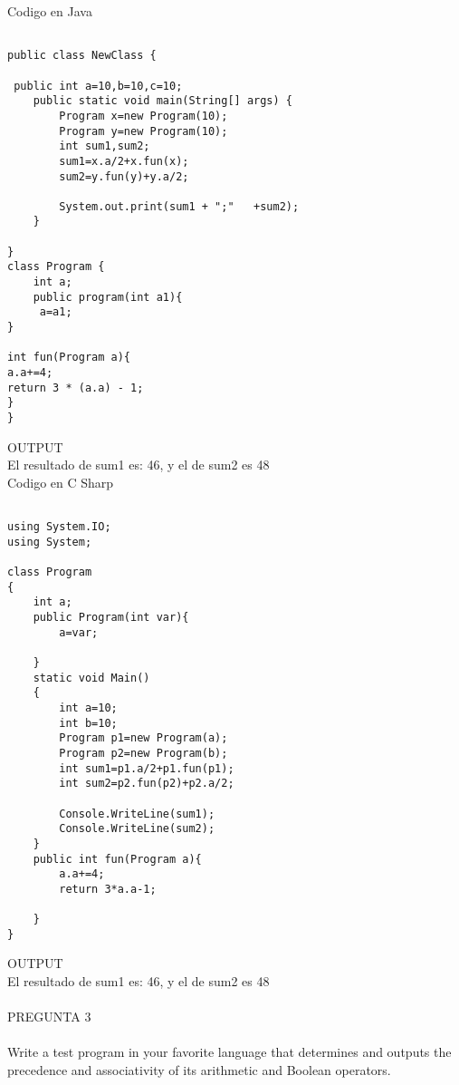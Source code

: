 \documentclass[../main.tex]{subfiles}
\begin{document}
Codigo en Java\\
\begin{lstlisting}[frame=single]  

public class NewClass {
    
 public int a=10,b=10,c=10;
    public static void main(String[] args) {
        Program x=new Program(10);
        Program y=new Program(10);
        int sum1,sum2;
        sum1=x.a/2+x.fun(x);
        sum2=y.fun(y)+y.a/2;

        System.out.print(sum1 + ";"   +sum2);
    }

}
class Program {
	int a;
	public program(int a1){
   	 a=a1;
}    

int fun(Program a){
a.a+=4;
return 3 * (a.a) - 1;
}
}

\end{lstlisting}
OUTPUT\\
El resultado de sum1 es: 46, y el de sum2 es 48\\




Codigo en C Sharp
\begin{lstlisting}[frame=single]

using System.IO;
using System;

class Program
{
    int a;
    public Program(int var){
        a=var;
        
    }
    static void Main()
    {
        int a=10;
        int b=10;
        Program p1=new Program(a);
        Program p2=new Program(b);
        int sum1=p1.a/2+p1.fun(p1);
        int sum2=p2.fun(p2)+p2.a/2;
        
        Console.WriteLine(sum1);
        Console.WriteLine(sum2);
    }
    public int fun(Program a){
        a.a+=4;
        return 3*a.a-1;
        
    }
}

\end{lstlisting}
OUTPUT\\
El resultado de sum1 es: 46, y el de sum2 es 48\\



\paragraph{ }PREGUNTA 3
\paragraph{ }
Write a test program in your favorite language that determines and outputs the precedence and associativity of its arithmetic and Boolean operators.
\end{document}
